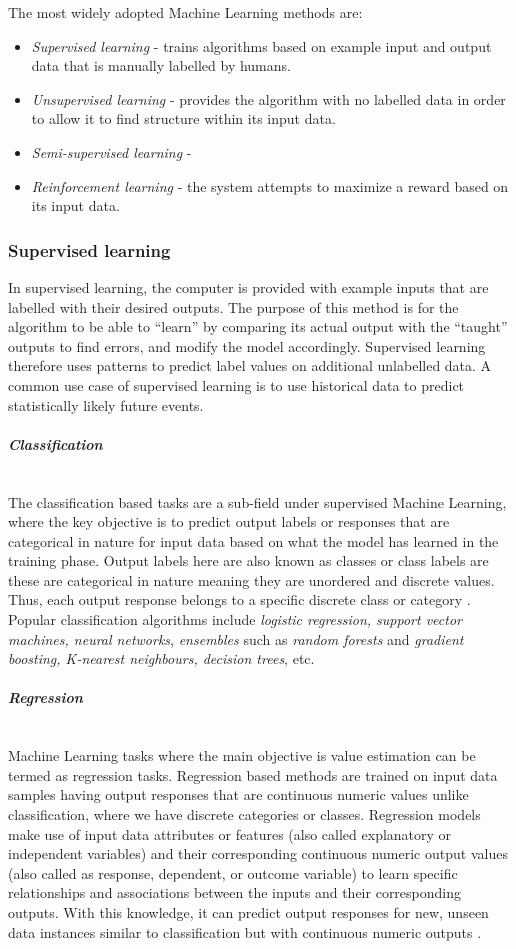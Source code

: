 \documentclass[12pt,a4paper]{article}
\newcommand{\myparagraph}[1]{\paragraph{#1}\mbox{}\\} %
\begin{document}
The most widely adopted Machine Learning methods are:
\begin{itemize}
    \item \textit{Supervised learning} - trains algorithms based on example input and output data that is manually labelled by humans.
    \item \textit{Unsupervised learning} - provides the algorithm with no labelled data in order to allow it to find structure within its input data. 
    \item \textit{Semi-supervised learning} - 
    \item \textit{Reinforcement learning} - the system attempts to maximize a reward based on its input data.   
\end{itemize}

\subsubsection{Supervised learning}
In supervised learning, the computer is provided with example inputs that are labelled with their desired outputs. The purpose of this method is for the algorithm to be able to “learn” by comparing its actual output with the “taught” outputs to find errors, and modify the model accordingly. Supervised learning therefore uses patterns to predict label values on additional unlabelled data. A common use case of supervised learning is to use historical data to predict statistically likely future events.

\myparagraph{\textit{Classification}}
The classification based tasks are a sub-field under supervised Machine Learning, where the key objective
is to predict output labels or responses that are categorical in nature for input data based on what the model
has learned in the training phase. Output labels here are also known as classes or class labels are these are
categorical in nature meaning they are unordered and discrete values. Thus, each output response belongs
to a specific discrete class or category \cite{Kononenko2007}.
Popular classification algorithms include \textit{logistic regression, support vector machines, neural networks},
\textit{ensembles} such as \textit{random forests} and \textit{gradient boosting, K-nearest neighbours, decision trees}, etc.

\myparagraph{\textit{Regression}}
Machine Learning tasks where the main objective is value estimation can be termed as regression tasks.
Regression based methods are trained on input data samples having output responses that are continuous
numeric values unlike classification, where we have discrete categories or classes. Regression models
make use of input data attributes or features (also called explanatory or independent variables) and their
corresponding continuous numeric output values (also called as response, dependent, or outcome variable)
to learn specific relationships and associations between the inputs and their corresponding outputs. With
this knowledge, it can predict output responses for new, unseen data instances similar to classification but
with continuous numeric outputs \cite{Kononenko2007}.
\end{document}
